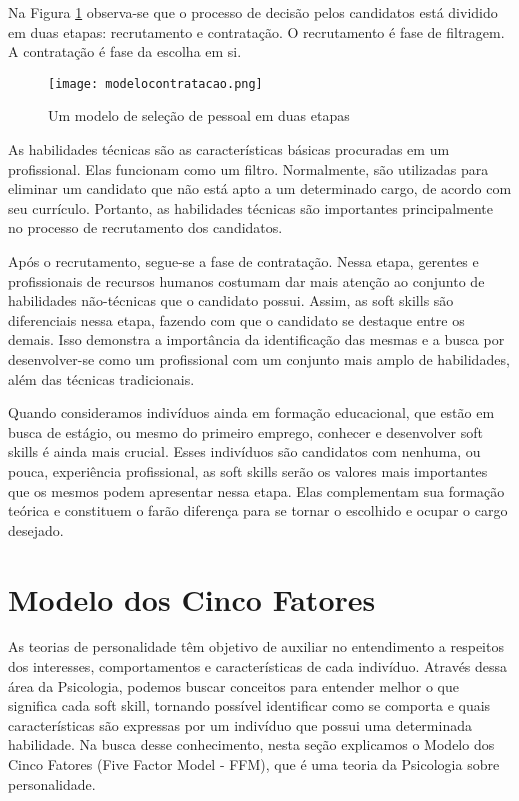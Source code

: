 Na Figura \ref{fig:modelocontratacao} observa-se que o processo de decisão pelos candidatos está dividido em duas etapas: recrutamento e contratação. O recrutamento é fase de filtragem. A contratação é fase da escolha em si.

\begin{figure}[h*]
\centering
\caption{\small Um modelo de seleção de pessoal em duas etapas}
\texttt{[image: modelocontratacao.png]}
\label{fig:modelocontratacao}
\end{figure}

As habilidades técnicas são as características básicas procuradas em um profissional. Elas funcionam como um filtro. Normalmente, são utilizadas para eliminar um candidato que não está apto a um determinado cargo, de acordo com seu currículo. Portanto, as habilidades técnicas são importantes principalmente no processo de recrutamento dos candidatos.

Após o recrutamento, segue-se a fase de contratação. Nessa etapa, gerentes e profissionais de recursos humanos costumam dar mais atenção ao conjunto de habilidades não-técnicas que o candidato possui. Assim, as soft skills são diferenciais nessa etapa, fazendo com que o candidato se destaque entre os demais. Isso demonstra a importância da identificação das mesmas e a busca por desenvolver-se como um profissional com um conjunto mais amplo de habilidades, além das técnicas tradicionais.

Quando consideramos indivíduos ainda em formação educacional, que estão em busca de estágio, ou mesmo do primeiro emprego, conhecer e desenvolver soft skills é ainda mais crucial. Esses indivíduos são candidatos com nenhuma, ou pouca, experiência profissional, as soft skills serão os valores mais importantes que os mesmos podem apresentar nessa etapa. Elas complementam sua formação teórica e constituem o farão diferença para se tornar o escolhido e ocupar o cargo desejado.

\section{Modelo dos Cinco Fatores}
\label{sec:ffm}

As teorias de personalidade têm objetivo de auxiliar no entendimento a respeitos dos interesses, comportamentos e características de cada indivíduo. Através dessa área da Psicologia, podemos buscar conceitos para entender melhor o que significa cada soft skill, tornando possível identificar como se comporta e quais características são expressas por um indivíduo que possui uma determinada habilidade. Na busca desse conhecimento, nesta seção explicamos o Modelo dos Cinco Fatores (Five Factor Model - FFM), que é uma teoria da Psicologia sobre personalidade.

